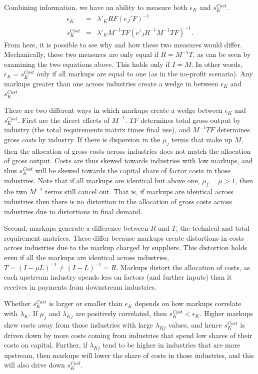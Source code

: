 \documentclass[11pt]{article}
\begin{document}
Combining information, we have an ability to measure both $\epsilon_K$ and $s_K^{Cost}$. 
\begin{eqnarray}
	\epsilon_K &=& \lambda'_K R F \left(e_J'F\right)^{-1} \\
	s_K^{Cost} &=& \lambda'_K M^{-1} T F \left(e'_J R^{-1} M^{-1} T F \right)^{-1}.
\end{eqnarray}
From here, it is possible to see why and how these two measures would differ. Mechanically, these two measures are only equal if $R = M^{-1} T$, as can be seen by examining the two equations above. This holds only if $I = M$. In other words, $\epsilon_K = s_K^{Cost}$ only if all markups are equal to one (as in the no-profit scenario). Any markups greater than one across industries create a wedge in between $\epsilon_K$ and $s_K^{Cost}$. 

There are two different ways in which markups create a wedge between $\epsilon_K$ and $s_K^{Cost}$. First are the direct effects of $M^{-1}$. $TF$ determines total gross output by industry (the total requirements matrix times final use), and $M^{-1} TF$ determines gross \textit{costs} by industry. If there is dispersion in the $\mu_j$ terms that make up $M$, then the allocation of gross costs across industries does not match the allocation of gross output. Costs are thus skewed towards industries with low markups, and thus $s_K^{Cost}$ will be skewed towards the capital share of factor costs in those industries. Note that if all markups are identical but above one, $\mu_j = \overline{\mu} > 1$, then the two $M^{-1}$ terms still cancel out. That is, if markups are identical across industries then there is no distortion in the allocation of gross costs across industries due to distortions in final demand.

Second, markups generate a difference between $R$ and $T$, the technical and total requirement matrices. These differ because markups create distortions in costs across industries due to the markup charged by suppliers. This distortion holds even if all the markups are identical across industries, $T = (I - \overline{\mu}L)^{-1} \neq (I - L)^{-1} = R$. Markups distort the allocation of costs, as each upstream industry spends less on factors (and further inputs) than it receives in payments from downstream industries. 

Whether $s_K^{Cost}$ is larger or smaller than $\epsilon_K$ depends on how markups correlate with $\lambda_K$. If $\mu_j$ and $\lambda_{Kj}$ are positively correlated, then $s_K^{Cost} < \epsilon_K$. Higher markups skew costs away from those industries with large $\lambda_{Kj}$ values, and hence $s_K^{Cost}$ is driven down by more costs coming from industries that spend low shares of their costs on capital. Further, if $\lambda_{Kj}$ tend to be higher in industries that are more upstream, then markups will lower the share of costs in those industries, and this will also drive down $s_K^{Cost}$. 
\end{document}
